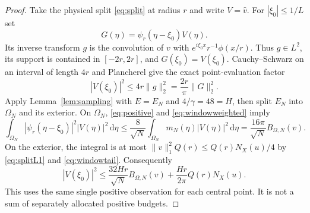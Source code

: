 \documentclass[11pt]{article}
\theoremstyle{remark}\newtheorem{remark}[theorem]{Remark}
\newcommand{\dd}{\,\mathrm d}
\newcommand{\norm}[1]{\lVert #1\rVert}
\newcommand{\NX}{N_X}
\numberwithin{equation}{section}
\begin{document}
\begin{proof}
Take the physical split \eqref{eq:split} at radius $r$ and write $V=\widehat v$. For $|\xi_0|\le1/L$ set
\[
 G(\eta)=\psi_r(\eta-\xi_0)V(\eta).
\]
Its inverse transform $g$ is the convolution of $v$ with
$e^{i\xi_0x}r^{-1}\phi(x/r)$. Thus $g\in L^2$, its support is contained in $[-2r,2r]$, and $G(\xi_0)=V(\xi_0)$. Cauchy--Schwarz on an interval of length $4r$ and Plancherel give the exact point-evaluation factor
\begin{equation}\label{eq:point}
 |V(\xi_0)|^2\le4r\norm{g}_2^2
 =\frac{2r}{\pi}\norm{G}_2^2.
\end{equation}
Apply Lemma~\ref{lem:sampling} with $E=E_N$ and $4/\gamma=48=H$, then split $E_N$ into $\Omega_N$ and its exterior. On $\Omega_N$, \eqref{eq:positive} and \eqref{eq:windowweighted} imply
\[
 \int_{\Omega_N}|\psi_r(\eta-\xi_0)|^2|V(\eta)|^2\dd\eta
 \le\frac8{\sqrt N}\int_{\Omega_N}m_N(\eta)|V(\eta)|^2\dd\eta
 =\frac{16\pi}{\sqrt N}B_{\Omega,N}(v).
\]
On the exterior, the integral is at most
$\norm{v}_1^2Q(r)\le Q(r)\NX(u)/4$ by \eqref{eq:splitL1} and \eqref{eq:windowtail}. Consequently
\begin{equation}\label{eq:collectivepoint}
 |V(\xi_0)|^2\le\frac{32Hr}{\sqrt N}B_{\Omega,N}(v)
                  +\frac{Hr}{2\pi}Q(r)\NX(u).
\end{equation}
This uses the same single positive observation for each central point. It is not a sum of separately allocated positive budgets.


\end{proof}
\end{document}
